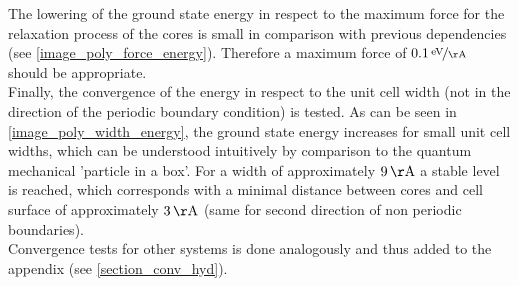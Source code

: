 The lowering of the ground state energy in respect to the maximum force for the relaxation process of the cores is small in comparison with previous dependencies (see \cref{image_poly_force_energy}). Therefore a maximum force of $\unitfrac[0.1]{eV}{\AA}$ should be appropriate.\\
Finally, the convergence of the energy in respect to the unit cell width (not in the direction of the periodic boundary condition) is tested. As can be seen in \cref{image_poly_width_energy}, the ground state energy increases for small unit cell widths, which can be understood intuitively by comparison to the quantum mechanical 'particle in a box'. For a width of approximately $\unit[9]{\AA}$ a stable level is reached, which corresponds with a minimal distance between cores and cell surface of approximately $\unit[3]{\AA}$ (same for second direction of non periodic boundaries).\\
Convergence tests for other systems is done analogously and thus added to the appendix (see \cref{section_conv_hyd}).

